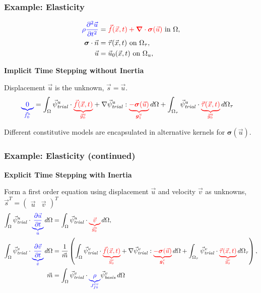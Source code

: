 \documentclass[aspectratio=169,hyperref=colorlinks]{beamer}
\newcommand{\lhs}[1]{{\color{blue}#1}}
\newcommand{\rhs}[1]{{\color{red}#1}}
\newcommand{\annotateL}[2]{%
  {\color{blue}\underbrace{\color{blue}#1}_{\color{blue}\mathclap{#2}}}}
\newcommand{\annotateR}[2]{%
  {\color{red}\underbrace{\color{red}#1}_{\color{red}\mathclap{#2}}}}
\newcommand{\trialvec}[1][]{{\vec{\psi}_\mathit{trial}^{#1}}}
\newcommand{\basisvec}[1][]{{\vec{\psi}_\mathit{basis}^{#1}}}
\newcommand{\tensor}[1]{\bm{#1}}
\begin{document}
\begin{frame}
  \frametitle{Example: Elasticity}
  \summary{}

      \begin{align}
        \lhs{\rho \frac{\partial^2\vec{u}}{\partial t^2}} &= \rhs{\vec{f}(\vec{x},t) + \tensor{\nabla} \cdot \tensor{\sigma}(\vec{u})} \text{ in } \Omega, \\
        \tensor{\sigma} \cdot \vec{n} &= \vec{\tau}(\vec{x},t) \text{ on } \Omega_\tau, \\
        \vec{u} &= \vec{u}_0(\vec{x},t) \text{ on } \Omega_u,
      \end{align}

      \vfill

      {\bf Implicit Time Stepping without Inertia}

      Displacement $\vec{u}$ is the unknown, $\vec{s}= \vec{u}$.
      \begin{align}
        \annotateL{0}{\vec{f}_0^u} &=
  \int_\Omega \trialvec[u] \cdot \annotateR{\vec{f}(\vec{x},t)}{\vec{g}_0^u} + \nabla \trialvec[u] : \annotateR{-\tensor{\sigma}(\vec{u})}{\tensor{g}_1^u} \, d\Omega + \int_{\Omega_\tau} \trialvec[u] \cdot \annotateR{\vec{\tau}(\vec{x},t)}{\vec{g}_0^u} \, d\Omega_\tau
      \end{align}

      \vfill
      Different constitutive models are encapsulated in alternative
      kernels for $\tensor{\sigma}(\vec{u})$.

\end{frame}

\begin{frame}
  \frametitle{Example: Elasticity (continued)}
  \summary{}

      {\bf Explicit Time Stepping with Inertia}

      Form a first order equation using displacement $\vec{u}$ and velocity $\vec{v}$ as
      unknowns, $\vec{s}^T = \left( \begin{array}{cc} \vec{u} & \vec{v} \end{array} \right)^T$
      \begin{align}
        \int_\Omega \trialvec[u] \cdot \annotateL{\frac{\partial \vec{u}}{\partial t}}{\dot{u}} \, d\Omega &= 
        \int_\Omega \trialvec[u] \cdot \annotateR{\vec{v}}{\vec{g}_0^u} \, d\Omega, \\
        \int_\Omega \trialvec[v] \cdot \annotateL{\frac{\partial \vec{v}}{\partial t}}{\dot{v}} \, d\Omega &=
\frac{1}{\vec{m}} \left(
  \int_\Omega \trialvec[v] \cdot \annotateR{\vec{f}(\vec{x},t)}{\vec{g}_0^v} + \nabla \trialvec[v] : \annotateR{-\tensor{\sigma}(\vec{u})}{\tensor{g}_1^v} \, d\Omega + \int_{\Omega_\tau} \trialvec[v] \cdot \annotateR{\vec{\tau}(\vec{x},t)}{\vec{g}_0^v} \, d\Omega_\tau \right), \\
\vec{m} &= \int_\Omega \trialvec[v] \cdot {\annotateL{\rho}{J_{f0}^{vv}}} \basisvec[v] \, d\Omega
      \end{align}


\end{frame}
\end{document}
